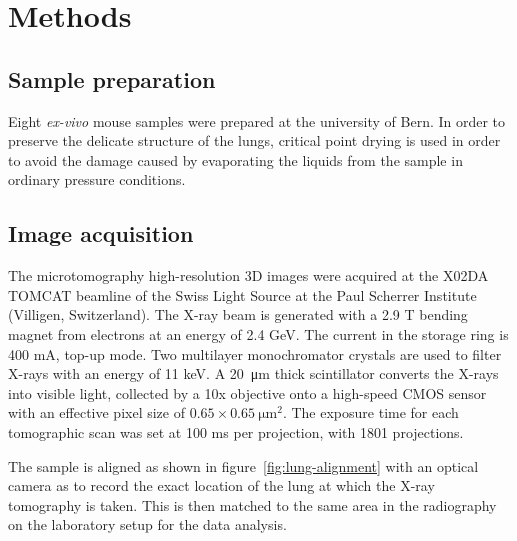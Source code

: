\section{Methods}\label{sec:methods}
\subsection{Sample preparation}
Eight \emph{ex-vivo} mouse samples were prepared at the university of Bern.
In order to preserve the delicate structure of the lungs, critical point
drying is used in order to avoid the damage caused by evaporating the liquids
from the sample in ordinary pressure conditions.

\subsection{Image acquisition}\label{sec:acquisition}
The microtomography high-resolution 3D images were acquired at the X02DA
TOMCAT beamline of the Swiss Light Source at the Paul Scherrer Institute
(Villigen, Switzerland). The X-ray beam is generated with a 2.9 T bending
magnet from electrons at an energy of 2.4 GeV. The current in the storage
ring is 400 mA, top-up mode. Two multilayer monochromator crystals are used
to filter X-rays with an energy of 11 keV. A \SI{20}{\micro\meter} thick scintillator
converts the X-rays into visible light, collected by a 10x objective onto a
high-speed CMOS sensor with an effective pixel size of $0.65 \times
\SI{0.65}{\micro\meter\squared}$. The exposure time for each tomographic
scan was set at 100 ms per projection, with 1801 projections.

The sample is aligned as shown in figure~\ref{fig:lung-alignment} with an
optical camera as to record the exact location of the lung at which the X-ray
tomography is taken. This is then matched to the same area in the
radiography on the laboratory setup for the data analysis.

